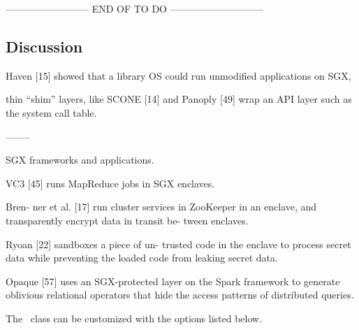-------------------------- END OF TO DO -----------------------------




\subsection{Discussion}
\label{ssec:sgx_frameworks_discussion}

Haven [15] showed
that a library OS could run unmodified applications on
SGX,

thin “shim” layers, like SCONE [14] and Panoply [49] wrap 
an API layer such as the system call table.


--------


SGX frameworks and applications.

VC3 [45]
runs MapReduce jobs in SGX enclaves.

Bren-
ner et al. [17] run cluster services in ZooKeeper in an
enclave, and transparently encrypt data in transit be-
tween enclaves.

Ryoan [22] sandboxes a piece of un-
trusted code in the enclave to process secret data while
preventing the loaded code from leaking secret data.

Opaque [57] uses an SGX-protected layer on the Spark
framework to generate oblivious relational operators that
hide the access patterns of distributed queries.

The \novathesis\ class can be customized with the options listed below.




